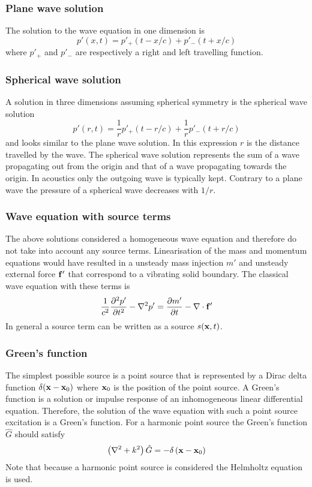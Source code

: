 \subsubsection*{Plane wave solution}
The solution to the wave equation in one dimension is
\begin{equation}
  p'(x,t) = p'_{+} (t-x/c) + p'_{-} (t+x/c)
\end{equation}
where $p'_{+}$ and $p'_{-}$ are respectively a right and left travelling function.

\subsubsection*{Spherical wave solution}
A solution in three dimensions assuming spherical symmetry is the spherical wave solution
\begin{equation}
  p'(r,t) = \frac{1}{r} p'_{+} (t-r/c) + \frac{1}{r} p'_{-} (t+r/c)
\end{equation}
and looks similar to the plane wave solution. In this expression $r$ is the
distance travelled by the wave. The spherical wave solution represents the sum
of a wave propagating out from the origin and that of a wave propagating towards
the origin. In acoustics only the outgoing wave is typically kept. Contrary to
a plane wave the pressure of a spherical wave decreases with $1/r$.

\subsubsection*{Wave equation with source terms}
The above solutions considered a homogeneous wave equation and therefore do not
take into account any source terms. Linearisation of the mass and momentum equations
would have resulted in a unsteady mass injection $m'$ and unsteady external
force $\mathbf{f'}$ that correspond to a vibrating solid boundary. The classical wave equation with these terms is
\begin{equation}
   \frac{1}{c^2} \frac{\partial^2 p'}{\partial t^2} - \nabla^2 p' = \frac{\partial m'}{\partial t} - \nabla \cdot \mathbf{f}'
\end{equation}
In general a source term can be written as a source $s(\mathbf{x}, t)$.

\subsubsection*{Green's function}\label{sec:theory:sound:green}
The simplest possible source is a point source that is represented by a Dirac
delta function $\delta(\mathbf{x}-\mathbf{x}_0)$ where $\mathbf{x}_0$ is the position
of the point source. A Green's function is a solution or impulse response of an
inhomogeneous linear differential equation.
Therefore, the solution of the wave equation with such a point source excitation
is a Green's function. For a harmonic point source the Green's function
$\hat{G}$ should satisfy
\begin{equation}
  \left( \nabla^2 + k^2 \right) \hat{G} = - \delta \left( \mathbf{x} - \mathbf{x}_0 \right)
\end{equation}
Note that because a harmonic point source is considered the Helmholtz equation
is used.

